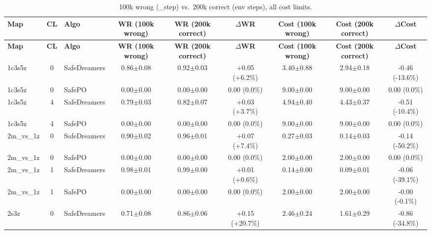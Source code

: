 \documentclass{article}
\begin{document}
\begin{longtable}{lclcccccc}
\caption{100k wrong (\_step) vs.\ 200k correct (env steps), all cost limits.} \\
\toprule
\textbf{Map} & \textbf{CL} & \textbf{Algo} & \textbf{WR (100k wrong)} & \textbf{WR (200k correct)} & \textbf{$\Delta$WR} & \textbf{Cost (100k wrong)} & \textbf{Cost (200k correct)} & \textbf{$\Delta$Cost} \\
\midrule
\endfirsthead
\toprule
\textbf{Map} & \textbf{CL} & \textbf{Algo} & \textbf{WR (100k wrong)} & \textbf{WR (200k correct)} & \textbf{$\Delta$WR} & \textbf{Cost (100k wrong)} & \textbf{Cost (200k correct)} & \textbf{$\Delta$Cost} \\
\midrule
\endhead
1c3s5z & 0 & SafeDreamers & 0.86$\pm$0.08 & 0.92$\pm$0.03 & \textcolor{green!55!black}{+0.05 (+6.2\%)} & 3.40$\pm$0.88 & 2.94$\pm$0.18 & \textcolor{green!55!black}{-0.46 (-13.6\%)} \\
1c3s5z & 0 & SafePO & 0.00$\pm$0.00 & 0.00$\pm$0.00 & \textcolor{red!40!black}{0.00 (0.0\%)} & 9.00$\pm$0.00 & 9.00$\pm$0.00 & \textcolor{green!40!black}{0.00 (0.0\%)} \\
1c3s5z & 4 & SafeDreamers & 0.79$\pm$0.03 & 0.82$\pm$0.07 & \textcolor{green!40!black}{+0.03 (+3.7\%)} & 4.94$\pm$0.40 & 4.43$\pm$0.37 & \textcolor{green!55!black}{-0.51 (-10.4\%)} \\
1c3s5z & 4 & SafePO & 0.00$\pm$0.00 & 0.00$\pm$0.00 & \textcolor{red!40!black}{0.00 (0.0\%)} & 9.00$\pm$0.00 & 9.00$\pm$0.00 & \textcolor{green!40!black}{0.00 (0.0\%)} \\
\midrule
2m\_vs\_1z & 0 & SafeDreamers & 0.90$\pm$0.02 & 0.96$\pm$0.01 & \textcolor{green!55!black}{+0.07 (+7.4\%)} & 0.27$\pm$0.03 & 0.14$\pm$0.03 & \textcolor{green!100!black}{-0.14 (-50.2\%)} \\
2m\_vs\_1z & 0 & SafePO & 0.00$\pm$0.00 & 0.00$\pm$0.00 & \textcolor{red!40!black}{0.00 (0.0\%)} & 2.00$\pm$0.00 & 2.00$\pm$0.00 & \textcolor{green!40!black}{0.00 (0.0\%)} \\
2m\_vs\_1z & 1 & SafeDreamers & 0.98$\pm$0.01 & 0.99$\pm$0.00 & \textcolor{green!40!black}{+0.01 (+0.6\%)} & 0.14$\pm$0.00 & 0.09$\pm$0.01 & \textcolor{green!85!black}{-0.06 (-39.1\%)} \\
2m\_vs\_1z & 1 & SafePO & 0.00$\pm$0.00 & 0.00$\pm$0.00 & \textcolor{red!40!black}{0.00 (0.0\%)} & 2.00$\pm$0.00 & 2.00$\pm$0.00 & \textcolor{green!40!black}{-0.00 (-0.1\%)} \\
\midrule
2s3z & 0 & SafeDreamers & 0.71$\pm$0.08 & 0.86$\pm$0.06 & \textcolor{green!70!black}{+0.15 (+20.7\%)} & 2.46$\pm$0.24 & 1.61$\pm$0.29 & \textcolor{green!85!black}{-0.86 (-34.8\%)} \\

\end{longtable}
\end{document}
